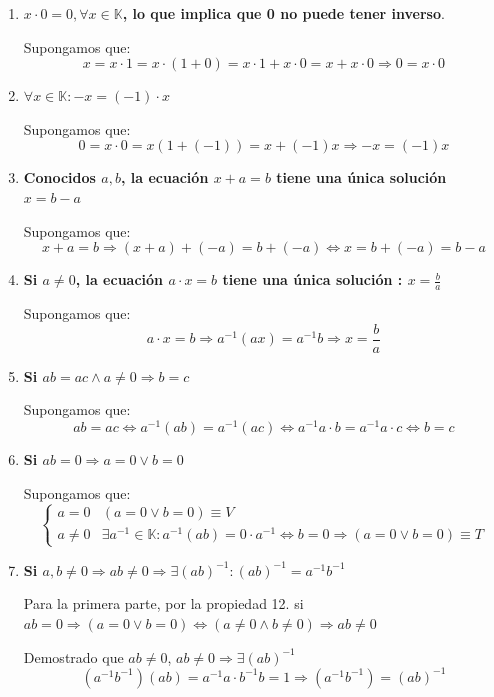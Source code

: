 \documentclass[10pt,a4paper,openright]{book}
\begin{document}
\begin{enumerate}
\item \textbf{$x\cdot 0=0, \forall x\in \mathbb K$, lo que implica que 0 no puede tener inverso}.\par
 Supongamos que:
 $$x=x\cdot 1=x\cdot (1+0)=x\cdot 1+ x\cdot 0=x+ x\cdot 0 \Rightarrow 0=x\cdot 0$$
 
\item \textbf{$\forall x\in \mathbb K : -x=(-1)\cdot x$}\par
 Supongamos que:
 $$0=x\cdot 0=x(1+(-1))=x+(-1)x \Rightarrow -x=(-1)x$$
 
\item \textbf{Conocidos $a, b$, la ecuación $x+a=b$ tiene una única solución $x=b-a$}\par
 Supongamos que:
 $$x+a=b \Rightarrow (x+a)+(-a)=b+(-a)\Leftrightarrow x=b+(-a)=b-a$$
 
\item \textbf{Si $a\neq 0$, la ecuación $a\cdot x=b$ tiene una única solución : $x=\frac{b}{a}$}\par
Supongamos que:
$$a\cdot x=b \Rightarrow a^{-1}(ax)=a^{-1}b \Rightarrow x=\frac{b}{a}$$

\item \textbf{Si $ab=ac \wedge a\neq 0 \Rightarrow b=c$}\par
 Supongamos que:
 $$ab=ac \Leftrightarrow a^{-1}(ab)=a^{-1}(ac) \Leftrightarrow a^{-1}a\cdot b=a^{-1}a\cdot c \Leftrightarrow b=c$$
 
\item \textbf{Si $ab=0\Rightarrow a=0 \vee b=0$}\par
 Supongamos que:
 \begin{equation*}
 \begin{cases}
  a=0 & (a=0\vee b=0) \equiv V \\
  a\neq 0 & \exists a^{-1}\in \mathbb K : a^{-1}(ab)=0\cdot a^{-1}\Leftrightarrow b=0\Rightarrow (a=0 \vee b=0)\equiv T
 \end{cases} 
 \end{equation*}
 
\item \textbf{Si $a, b \neq 0 \Rightarrow ab\neq 0 \Rightarrow \exists (ab)^{-1}:  (ab)^{-1}= a^{-1}b^{-1}$}\par
 Para la primera parte, por la propiedad 12. si $ab=0\Rightarrow (a=0\vee b=0)\Leftrightarrow (a\neq 0 \wedge b\neq 0) \Rightarrow ab\neq 0$\par
 Demostrado que $ab\neq 0$, $ab\neq 0\Rightarrow \exists (ab)^{-1}$
 $$(a^{-1}b^{-1})(ab)=a^{-1} a \cdot b^{-1} b=1 \Rightarrow (a^{-1}b^{-1})=(ab)^{-1}$$
\end{enumerate}
\end{document}
